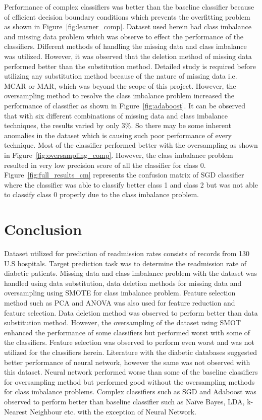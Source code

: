 \documentclass[conference]{IEEEtran}
\begin{document}
Performance of complex classifiers was better than the baseline classifier because of efficient decision boundary conditions which prevents the overfitting problem as shown in Figure~\ref{fig:learner_comp}. Dataset used herein had class imbalance and missing data problem which was observe to effect the performance of the classifiers. Different methods of handling the missing data and class imbalance was utilized. However, it was observed that the deletion method of missing data performed better than the substitution method. Detailed study is required before utilizing any substitution method because of the nature of missing data i.e. MCAR or MAR, which was beyond the scope of this project. However, the oversampling method to resolve the class imbalance problem increased the performance of classifier as shown in Figure~\ref{fig:adaboost}. It can be observed that with six different combinations of missing data and class imbalance techniques, the results varied by only 3\%. So there may be some inherent anomalies in the dataset which is causing such poor performance of every technique. Most of the classifier performed better with the oversampling as shown in Figure~\ref{fig:oversampling_comp}. However, the class imbalance problem resulted in very low precision score of all the classifier for class 0. Figure~\ref{fig:full_results_cm} represents the confusion matrix of SGD classifier where the classifier was able to classify better class 1 and class 2 but was not able to classify class 0 properly due to the class imbalance problem. 

\section{Conclusion}

Dataset utilized for prediction of readmission rates consists of records from 130 U.S hospitals. Target prediction task was to determine the readmission rate of diabetic patients. Missing data and class imbalance problem with the dataset was handled using data substitution, data deletion methods for missing data and oversampling using SMOTE for class imbalance problem. Feature selection method such as PCA and ANOVA was also used for feature reduction and feature selection. Data deletion method was observed to perform better than data substitution method. However, the oversampling of the dataset using SMOT enhanced the performance of some classifiers but performed worst with some of the classifiers. Feature selection was observed to perform even worst and was not utilized for the classifiers herein. Literature with the diabetic databases suggested better performance of neural network, however the same was not observed with this dataset. Neural network performed worse than some of the baseline classifiers for oversampling method but performed good without the oversampling methods for class imbalance problems. Complex classifiers such as SGD and Adaboost was observed to perform better than baseline classifier such as Naïve Bayes, LDA, k-Nearest Neighbour etc. with the exception of Neural Network.
\end{document}
